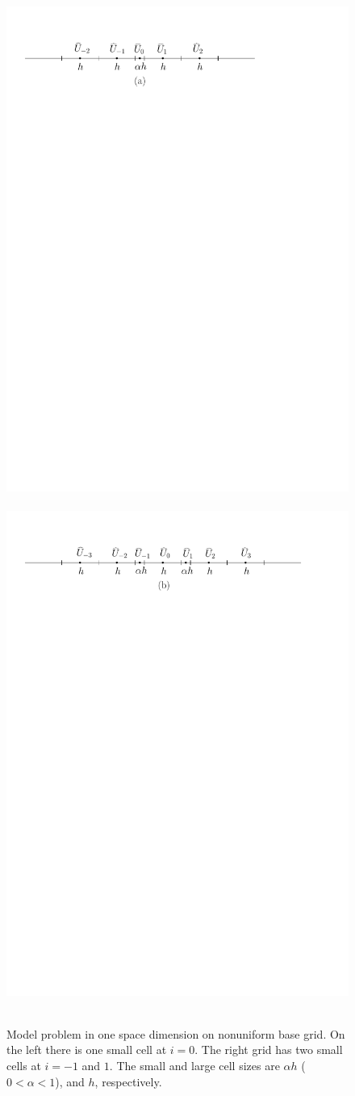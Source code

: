 \begin{figure}[h]
\begin{center}
\vspace*{.2in}
\mbox{
\includegraphics[width=0.4 \linewidth,trim=25 0 15 0,clip]{figs/overlapping_simple.pdf} 
\hspace*{.2in}
\includegraphics[width=0.55\linewidth,trim=20 0 25 0,clip]{figs/overlapping.pdf}
}
\vspace*{.1in}
\caption{\sf Model problem in one space dimension on nonuniform base grid.
On the left there is one small cell at $i=0$. The right grid has two small 
cells  at $i = -1$ and $1$.  The small and large cell 
sizes are $\alpha h$ ($0<\alpha < 1$), and $h$, respectively. \label{fig:ng1}}
\end{center}
\end{figure}

